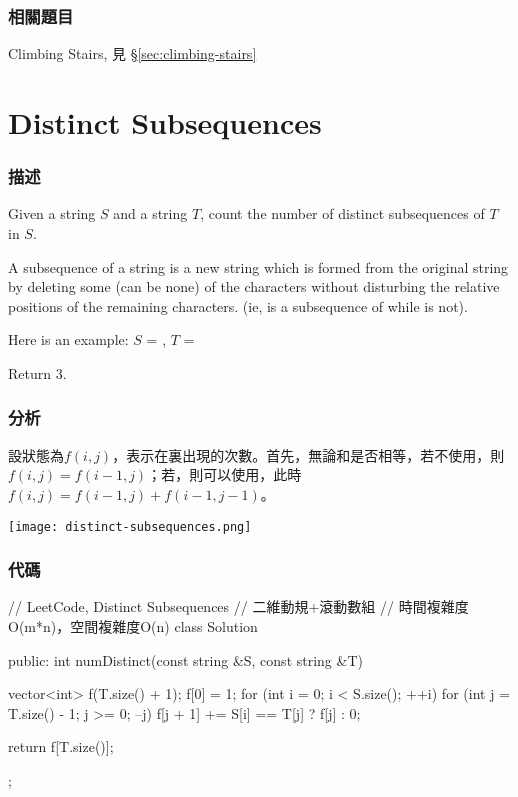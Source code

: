 \subsubsection{相關題目}
\begindot
\item Climbing Stairs, 見 \S \ref{sec:climbing-stairs}
\myenddot


\section{Distinct Subsequences} %
\label{sec:distinct-subsequences}


\subsubsection{描述}
Given a string $S$ and a string $T$, count the number of distinct subsequences of $T$ in $S$.

A subsequence of a string is a new string which is formed from the original string by deleting some (can be none) of the characters without disturbing the relative positions of the remaining characters. (ie,  is a subsequence of  while  is not).

Here is an example:
$S$ = , $T$ = 

Return 3.


\subsubsection{分析}
設狀態為$f(i,j)$，表示在裏出現的次數。首先，無論和是否相等，若不使用，則$f(i,j)=f(i-1,j)$；若，則可以使用，此時$f(i,j)=f(i-1,j)+f(i-1, j-1)$。

\begin{center}
\texttt{[image: distinct-subsequences.png]}\\
\label{fig:distinct-subsequences}
\end{center}

\subsubsection{代碼}
\begin{Code}
// LeetCode, Distinct Subsequences
// 二維動規+滾動數組
// 時間複雜度O(m*n)，空間複雜度O(n)
class Solution {
public:
    int numDistinct(const string &S, const string &T) {
        vector<int> f(T.size() + 1);
        f[0] = 1;
        for (int i = 0; i < S.size(); ++i) {
            for (int j = T.size() - 1; j >= 0; --j) {
                f[j + 1] += S[i] == T[j] ? f[j] : 0;
            }
        }

        return f[T.size()];
    }
};
\end{Code}


